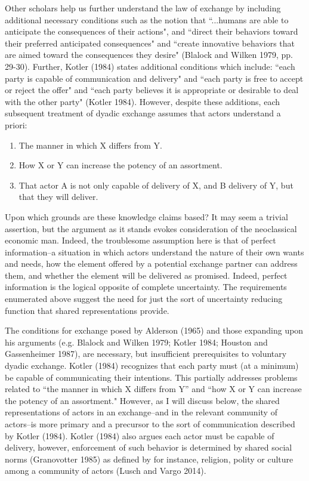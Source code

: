 Other scholars help us further understand the law of exchange by including additional necessary conditions such as the notion that ``...humans are able to anticipate the consequences of their actions", and ``direct their behaviors toward their preferred anticipated consequences" and ``create innovative behaviors that are aimed toward the consequences they desire" (Blalock and Wilken 1979, pp. 29-30).  Further, Kotler (1984) states additional conditions which include: ``each party is capable of communication and delivery" and ``each party is free to accept or reject the offer" and ``each party believes it is appropriate or desirable to deal with the other party" (Kotler 1984). However, despite these additions, each subsequent treatment of dyadic exchange assumes that actors understand a priori: 
\begin{enumerate}
  \item The manner in which X differs from Y.
  \item How X or Y can increase the potency of an assortment.
  \item That actor A is not only capable of delivery of X, and B delivery of Y, but that they will deliver. 
\end{enumerate}

Upon which grounds are these knowledge claims based? It may seem a trivial assertion, but the argument as it stands evokes consideration of the neoclassical economic man. Indeed, the troublesome assumption here is that of perfect information--a situation in which actors understand the nature of their own wants and needs, how the element offered by a potential exchange partner can address them, and whether the element will be delivered as promised. Indeed, perfect information is the logical opposite of complete uncertainty. The requirements enumerated above suggest the need for just the sort of uncertainty reducing function that shared representations provide. 

The conditions for exchange posed by Alderson (1965) and those expanding upon his arguments (e.g. Blalock and Wilken 1979; Kotler 1984; Houston and Gassenheimer 1987), are necessary, but insufficient prerequisites to voluntary dyadic exchange. Kotler (1984) recognizes that each party must (at a minimum) be capable of communicating their intentions. This partially addresses problems related to ``the manner in which X differs from Y'' and ``how X or Y can increase the potency of an assortment." However, as I will discuss below, the shared representations of actors in an exchange--and in the relevant community of actors--is more primary and a precursor to the sort of communication described by Kotler (1984). Kotler (1984) also argues each actor must be capable of delivery, however, enforcement of such behavior is determined by shared social norms (Granovotter 1985) as defined by for instance, religion, polity or culture among a community of actors (Lusch and Vargo 2014). 


